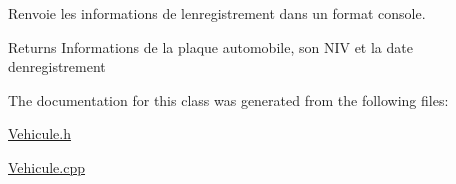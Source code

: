 Renvoie les informations de l\textquotesingle{}enregistrement dans un format console. 

\begin{DoxyReturn}{Returns}
Informations de la plaque automobile, son N\+IV et la date d\textquotesingle{}enregistrement 
\end{DoxyReturn}


The documentation for this class was generated from the following files\+:\begin{DoxyCompactItemize}
\item 
\hyperlink{Vehicule_8h}{Vehicule.\+h}\item 
\hyperlink{Vehicule_8cpp}{Vehicule.\+cpp}\end{DoxyCompactItemize}

